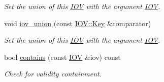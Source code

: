 \begin{DoxyCompactItemize}
\begin{DoxyCompactList}\small\item\em Set the union of this \hyperlink{class_d_d4hep_1_1_i_o_v}{I\+OV} with the argument \hyperlink{class_d_d4hep_1_1_i_o_v}{I\+OV}. \end{DoxyCompactList}\item 
void \hyperlink{class_d_d4hep_1_1_i_o_v_ad6a050933305a95b61d26975c057590e}{iov\+\_\+union} (const \hyperlink{class_d_d4hep_1_1_i_o_v_a07cb46dc875296dc9cccf4ff370104ae}{I\+O\+V\+::\+Key} \&comparator)
\begin{DoxyCompactList}\small\item\em Set the union of this \hyperlink{class_d_d4hep_1_1_i_o_v}{I\+OV} with the argument \hyperlink{class_d_d4hep_1_1_i_o_v}{I\+OV}. \end{DoxyCompactList}\item 
bool \hyperlink{class_d_d4hep_1_1_i_o_v_a5cd2623441069946551462e2d8a98174}{contains} (const \hyperlink{class_d_d4hep_1_1_i_o_v}{I\+OV} \&iov) const
\begin{DoxyCompactList}\small\item\em Check for validity containment. \end{DoxyCompactList}\end{DoxyCompactItemize}
